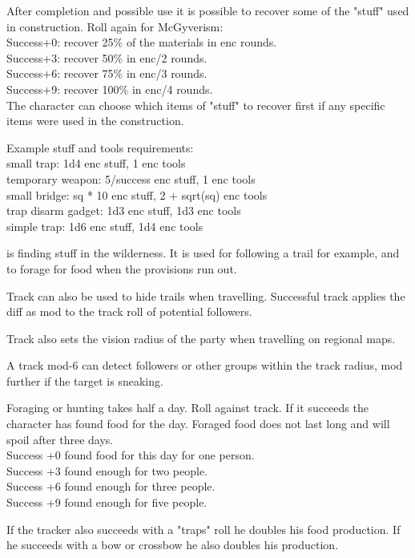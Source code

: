 After completion and possible use it is possible to recover some of the "stuff" used in construction. Roll again for McGyverism: \\
Success+0: recover 25\% of the materials in enc rounds. \\
Success+3: recover 50\% in enc/2 rounds. \\
Success+6: recover 75\% in enc/3 rounds. \\
Success+9: recover 100\% in enc/4 rounds. \\
The character can choose which items of "stuff" to recover first if any specific items were used in the construction.

Example stuff and tools requirements: \\
small trap: 1d4 enc stuff, 1 enc tools \\
temporary weapon: 5/success enc stuff, 1 enc tools \\
small bridge: sq * 10 enc stuff, 2 + sqrt(sq) enc tools \\
trap disarm gadget: 1d3 enc stuff, 1d3 enc tools \\
simple trap: 1d6 enc stuff, 1d4 enc tools


 is finding stuff in the wilderness. It is used for following a trail for example, and to forage for food when the provisions run out.

Track can also be used to hide trails when travelling. Successful track applies the diff as mod to the track roll of potential followers.

Track also sets the vision radius of the party when travelling on regional maps.

A track mod-6 can detect followers or other groups within the track radius, mod further if the target is sneaking.

Foraging or hunting takes half a day. Roll against track. If it succeeds the character has found food for the day. Foraged food does not last long and will spoil after three days. \\
Success +0 found food for this day for one person. \\
Success +3 found enough for two people. \\
Success +6 found enough for three people. \\
Success +9 found enough for five people.

If the tracker also succeeds with a "traps" roll he doubles his food production. If he succeeds with a bow or crossbow he also doubles his production.

